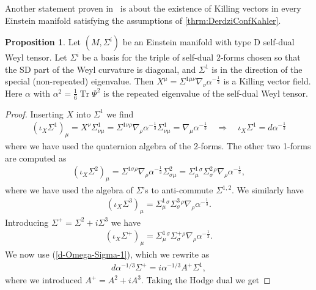 \documentclass[10pt]{report}
\theoremstyle{definition}
\newtheorem{proposition}{Proposition}[chapter]
\DeclareMathOperator{\Tr}{Tr}
\begin{document}
Another statement proven in~\cite{SelfDualKahleDerdzi1983} is about the existence of Killing vectors in every Einstein manifold satisfying the assumptions of \cref{thrm:DerdziConfKahler}. 
\begin{proposition} \label{prop:ConfKahlerKillingVector}
    Let $(M,\Sigma^i)$ be an Einstein manifold with type D self-dual Weyl tensor. Let $\Sigma^i$ be a basis for the triple of self-dual 2-forms chosen so that the SD part of the Weyl curvature is diagonal, and $\Sigma^1$ is in the direction of the special (non-repeated) eigenvalue. Then $X^\mu = \Sigma^{1\mu \nu} \nabla_\nu \alpha^{-\frac{1}{3}}$ is a Killing vector field. Here $\alpha$ with $\alpha^2 = \frac{1}{6}\Tr{\Psi^2}$ is the repeated eigenvalue of the self-dual Weyl tensor.
\end{proposition}
\begin{proof}
    Inserting $X$ into $\Sigma^1$ we find
    \begin{align}
        (\iota_X \Sigma^1)_\mu = X^\nu \Sigma^1_{\nu \mu} = \Sigma^{1 \nu \rho} \nabla_\rho \alpha^{-\frac{1}{3}} \Sigma^1_{\nu \mu} = \nabla_\mu \alpha^{-\frac{1}{3}} \quad \Rightarrow \quad \iota_X \Sigma^1 = d\alpha^{-\frac{1}{3}}
    \end{align}
    where we have used the quaternion algebra of the 2-forms. The other two 1-forms are computed as
    \begin{align}
    (\iota_X \Sigma^2)_\mu = \Sigma^{1\sigma\rho} \nabla_\rho \alpha^{-\frac{1}{3}} \Sigma^2_{\sigma\mu}= \Sigma^1_\mu{}^\sigma \Sigma^2_\sigma{}^\rho \nabla_\rho \alpha^{-\frac{1}{3}},
      \end{align}
      where we have used the algebra of $\Sigma$'s to anti-commute $\Sigma^{1,2}$. We similarly have
     \begin{align}
     (\iota_X \Sigma^3)_\mu = \Sigma^1_\mu{}^\sigma \Sigma^3_\sigma{}^\rho \nabla_\rho \alpha^{-\frac{1}{3}}.
     \end{align}
     Introducing $\Sigma^+ = \Sigma^2+ i \Sigma^3$ we have
      \begin{align}\label{i-X-Sigma-plus}
      (\iota_X \Sigma^+)_\mu = \Sigma^1_\mu{}^\sigma \Sigma^+_\sigma{}^\rho \nabla_\rho \alpha^{-\frac{1}{3}}.
      \end{align}
      We now use (\ref{d-Omega-Sigma-1}), which we rewrite as 
      \begin{align}
      d\alpha^{-1/3} \Sigma^+ = i \alpha^{-1/3} A^+ \Sigma^1,
      \end{align}
      where we introduced $A^+=A^2+ iA^3$. Taking the Hodge dual we get

\end{proof}
\end{document}

